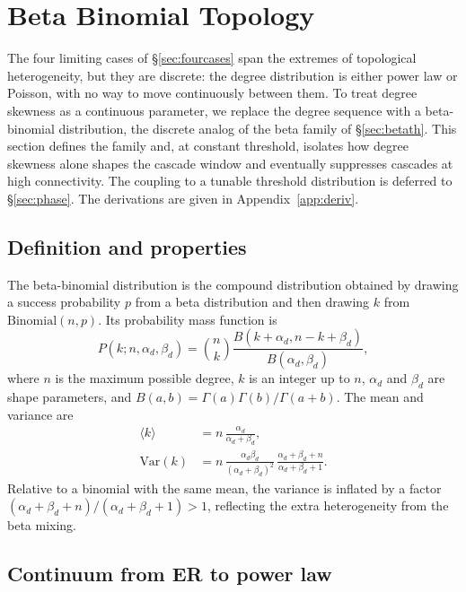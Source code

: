 \documentclass[]{revtex4-2}
\begin{document}
\section{Beta Binomial Topology}
\label{sec:bbtopo}

The four limiting cases of \S\ref{sec:fourcases} span the extremes of topological heterogeneity, but they are discrete: the degree distribution is either power law or Poisson, with no way to move continuously between them. To treat degree skewness as a continuous parameter, we replace the degree sequence with a beta-binomial distribution, the discrete analog of the beta family of \S\ref{sec:betath}. This section defines the family and, at constant threshold, isolates how degree skewness alone shapes the cascade window and eventually suppresses cascades at high connectivity. The coupling to a tunable threshold distribution is deferred to \S\ref{sec:phase}. The derivations are given in Appendix~\ref{app:deriv}.

\subsection{Definition and properties}

The beta-binomial distribution is the compound distribution obtained by drawing a success probability $p$ from a beta distribution and then drawing $k$ from $\text{Binomial}(n,p)$. Its probability mass function is
\begin{equation}
    P(k; n, \alpha_d, \beta_d) = \binom{n}{k} \frac{B(k+\alpha_d, n-k+\beta_d)}{B(\alpha_d, \beta_d)},
    \label{eq:bb-pmf}
\end{equation}
where $n$ is the maximum possible degree, $k$ is an integer up to $n$, $\alpha_d$ and $\beta_d$ are shape parameters, and $B(a,b)=\Gamma(a)\Gamma(b)/\Gamma(a+b)$. The mean and variance are
\begin{align}
    \langle k \rangle &= n\,\frac{\alpha_d}{\alpha_d+\beta_d},\\
    \text{Var}(k) &= n\,\frac{\alpha_d\beta_d}{(\alpha_d+\beta_d)^2}\,
    \frac{\alpha_d+\beta_d+n}{\alpha_d+\beta_d+1}.
\end{align}
Relative to a binomial with the same mean, the variance is inflated by a factor $(\alpha_d+\beta_d+n)/(\alpha_d+\beta_d+1)>1$, reflecting the extra heterogeneity from the beta mixing.

\subsection{Continuum from ER to power law}
\end{document}
